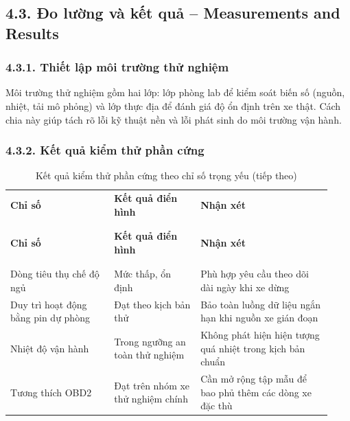 \documentclass[a4paper]{extarticle}
\newcommand{\thesissettableid}[2]{%
  \renewcommand{\thetable}{#1}%
  \renewcommand{\theHtable}{#2}%
}
\begin{document}
\subsection{4.3. Đo lường và kết quả -- Measurements and Results}

\subsubsection{4.3.1. Thiết lập môi trường thử nghiệm}

Môi trường thử nghiệm gồm hai lớp: lớp phòng lab để kiểm soát biến số (nguồn, nhiệt, tải mô phỏng) và lớp thực địa để đánh giá độ ổn định trên xe thật. Cách chia này giúp tách rõ lỗi kỹ thuật nền và lỗi phát sinh do môi trường vận hành.

\subsubsection{4.3.2. Kết quả kiểm thử phần cứng}

{\thesissettableid{4.3}{tab-condensed-ch4-hardware-results}
\def\LTcaptype{table}
\begin{longtable}{|L{0.300\linewidth}|L{0.250\linewidth}|L{0.380\linewidth}|}
\caption{Kết quả kiểm thử phần cứng theo chỉ số trọng yếu}\label{tab:condensed-ch4-hardware-results}\\
\hline \textbf{Chỉ số} & \textbf{Kết quả điển hình} & \textbf{Nhận xét} \\
\\\hline
\endfirsthead
\caption[]{Kết quả kiểm thử phần cứng theo chỉ số trọng yếu (tiếp theo)}\\
\hline \textbf{Chỉ số} & \textbf{Kết quả điển hình} & \textbf{Nhận xét} \\
\\\hline
\endhead
\\\hline
\endfoot
\endlastfoot
Dòng tiêu thụ chế độ ngủ & Mức thấp, ổn định & Phù hợp yêu cầu theo dõi dài ngày khi xe dừng \\\hline
Duy trì hoạt động bằng pin dự phòng & Đạt theo kịch bản thử & Bảo toàn luồng dữ liệu ngắn hạn khi nguồn xe gián đoạn \\\hline
Nhiệt độ vận hành & Trong ngưỡng an toàn thử nghiệm & Không phát hiện hiện tượng quá nhiệt trong kịch bản chuẩn \\\hline
Tương thích OBD2 & Đạt trên nhóm xe thử nghiệm chính & Cần mở rộng tập mẫu để bao phủ thêm các dòng xe đặc thù \\\hline
\end{longtable}
}
\end{document}
